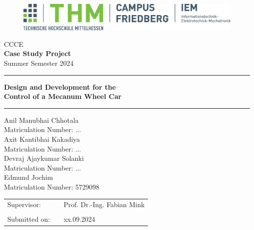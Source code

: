 \documentclass[a4paper, 12pt,titlepage,openany]{report}
\renewcommand{\baselinestretch}{1.15}
\begin{document}
	\thispagestyle{empty}
	
	\begin{flushleft}
		\begin{figure}[!htb]
			\centering
			\vspace*{-1\baselineskip}
			\includegraphics[scale=.45]{Logo_THM_CF_FB11_4c.eps}
		\end{figure}
	\end{flushleft}
	\vspace*{3\baselineskip}
	\begin{center}
		CCCE\\
		\textbf{Case Study Project}\\
		Summer Semester 2024
		\vspace*{3\baselineskip}
		\hrule
		\vspace*{1\baselineskip}
		{\LARGE \textbf{Design and Development for the\\Control of a Mecanum Wheel Car}}
		\vspace*{1.3\baselineskip}
		\hrule
		\vspace*{2\baselineskip}
		Anil Manubhai Chhotala\\
		Matriculation Number: ...\\
		\vspace*{1\baselineskip}
		Axit Kantibhai Kakadiya\\
		Matriculation Number: ...\\
		\vspace*{1\baselineskip}
		Devraj Ajaykumar Solanki\\
		Matriculation Number: ...\\
		\vspace*{1\baselineskip}
		Edmund Jochim\\
		Matriculation Number: 5729098\\
		\vspace*{3\baselineskip}
		\begin{tabular}{lcl}
			Supervisor: &  & Prof. Dr.-Ing. Fabian Mink\\
			& &\\
			Submitted on: & & xx.09.2024
		\end{tabular}
	\end{center}
	
	\clearpage
	\renewcommand{\baselinestretch}{1.15}
	\normalsize
	
\end{document}
